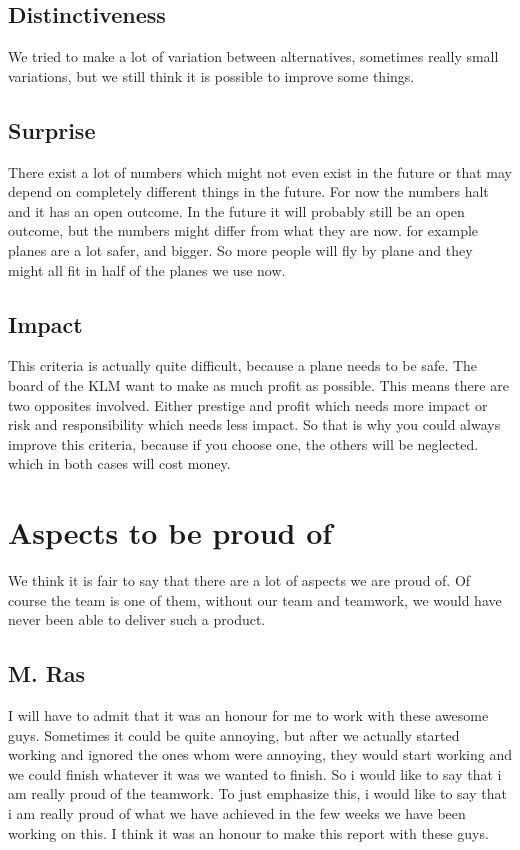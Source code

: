 \documentclass[a4paper, 11pt, notitlepage]{report}
\begin{document}
\section{Distinctiveness}
    We tried to make a lot of variation between alternatives, sometimes really small variations, but we still think it is possible to improve some things.
\section{Surprise}
    There exist a lot of numbers which might not even exist in the future or that may depend on completely different things in the future. For now the numbers halt and it has an open outcome. In the future it will probably still be an open outcome, but the numbers might differ from what they are now. for example planes are a lot safer, and bigger. So more people will fly by plane and they might all fit in half of the planes we use now.
\section{Impact}
    This criteria is actually quite difficult, because a plane needs to be safe. The board of the KLM want to make as much profit as possible. This means there are two opposites involved. Either prestige and profit which needs more impact or risk and responsibility which needs less impact. So that is why you could always improve this criteria, because if you choose one, the others will be neglected. which in both cases will cost money.
	
\chapter{Aspects to be proud of}
	We think it is fair to say that there are a lot of aspects we are proud of. Of course the team is one of them, without our team and teamwork, we would have never been able to deliver such a product.
	
	\section*{M. Ras}I will have to admit that it was an honour for me to work with these awesome guys. Sometimes it could be quite annoying, but after we actually started working and ignored the ones whom were annoying, they would start working and we could finish whatever it was we wanted to finish. So i would like to say that i am really proud of the teamwork. To just emphasize this, i would like to say that i am really proud of what we have achieved in the few weeks we have been working on this. I think it was an honour to make this report with these guys.
	
\end{document}
